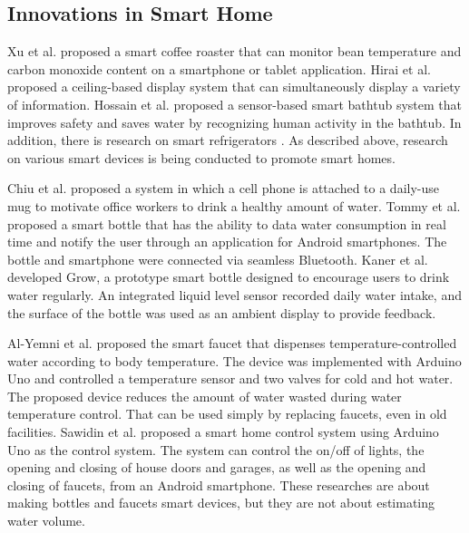 \documentclass[sigconf]{acmart}
\begin{document}
\subsection{Innovations in Smart Home}
Xu et al. \cite{smart_home1} proposed a smart coffee roaster that can monitor bean temperature and carbon monoxide content on a smartphone or tablet application.
Hirai et al. \cite{smart_home2} proposed a ceiling-based display system that can simultaneously display a variety of information.
Hossain et al. \cite{smart_home3} proposed a sensor-based smart bathtub system that improves safety and saves water by recognizing human activity in the bathtub.
In addition, there is research on smart refrigerators \cite{smart_refrigerator1, smart_refrigerator2, smart_refrigerator3, smart_refrigerator4}.
As described above, research on various smart devices is being conducted to promote smart homes.\par

Chiu et al. \cite{PlayfulBottle} proposed a system in which a cell phone is attached to a daily-use mug to motivate office workers to drink a healthy amount of water.
Tommy et al. \cite{SmartBottle} proposed a smart bottle that has the ability to data water consumption in real time and notify the user through an application for Android smartphones. The bottle and smartphone were connected via seamless Bluetooth.
Kaner et al. \cite{GROW} developed Grow, a prototype smart bottle designed to encourage users to drink water regularly. An integrated liquid level sensor recorded daily water intake, and the surface of the bottle was used as an ambient display to provide feedback.\par

Al-Yemni et al. \cite{smart_faucet2} proposed the smart faucet that dispenses  temperature-controlled water according to body temperature. The device was implemented with Arduino Uno and controlled a temperature sensor and two valves for cold and hot water. The proposed device reduces the amount of water wasted during water temperature control. That can be used simply by replacing faucets, even in old facilities.
Sawidin et al. \cite{smart_faucet3} proposed a smart home control system using Arduino Uno as the control system. The system can control the on/off of lights, the opening and closing of house doors and garages, as well as the opening and closing of faucets, from an Android smartphone.
These researches are about making bottles and faucets smart devices, but they are not about estimating water volume.
\end{document}
